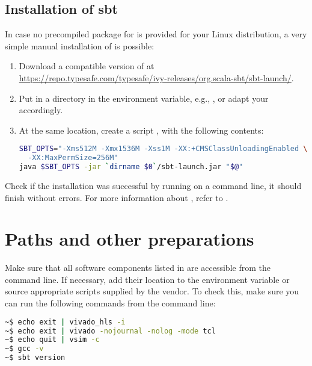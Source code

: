 \subsection*{Installation of sbt}
In case no precompiled package for  is provided for your Linux distribution, a very simple manual installation of  is possible:

\begin{enumerate}
  \item Download a compatible version of  at\\
        \url{https://repo.typesafe.com/typesafe/ivy-releases/org.scala-sbt/sbt-launch/}.
  \item Put  in a directory in the  environment variable, e.g., , or adapt your  accordingly.
  \item At the same location, create a script , with the following contents:
        \begin{lstlisting}[language=bash]
SBT_OPTS="-Xms512M -Xmx1536M -Xss1M -XX:+CMSClassUnloadingEnabled \
  -XX:MaxPermSize=256M"
java $SBT_OPTS -jar `dirname $0`/sbt-launch.jar "$@"
	\end{lstlisting}
\end{enumerate}

Check if the installation was successful by running  on a command line, it should finish without errors.
For more information about \gloss{sbt}, refer to \cite{sbt}.

\section{Paths and other preparations}
Make sure that all software components listed in  are accessible from the command line.
If necessary, add their location to the \code{PATH} environment variable or source appropriate scripts supplied by the vendor.
To check this, make sure you can run the following commands from the command line:

\begin{lstlisting}[language=bash, breaklines=true]
~$ echo exit | vivado_hls -i
~$ echo exit | vivado -nojournal -nolog -mode tcl 
~$ echo quit | vsim -c
~$ gcc -v
~$ sbt version
\end{lstlisting}

